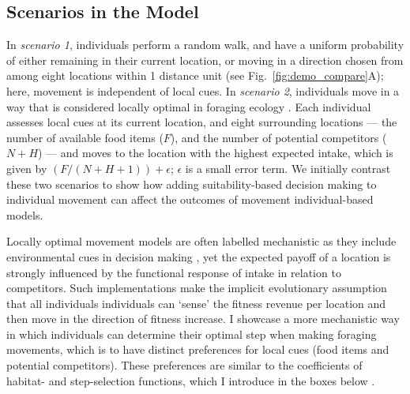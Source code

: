 \begin{interludeenv}
\subsection*{Scenarios in the Model}

In \textit{scenario 1}, individuals perform a random walk, and have a uniform probability of either remaining in their current location, or moving in a direction chosen from among eight locations within 1 distance unit (see Fig.~\ref{fig:demo_compare}A); here, movement is independent of local cues.
In \textit{scenario 2}, individuals move in a way that is considered locally optimal in foraging ecology \citep{stephens2019,scherer2020}.
Each individual assesses local cues at its current location, and eight surrounding locations --- the number of available food items ($F$), and the number of potential competitors ($N + H$) --- and moves to the location with the highest expected intake, which is given by $(F / (N + H + 1)) + \epsilon$; $\epsilon$ is a small error term.
We initially contrast these two scenarios to show how adding suitability-based decision making to individual movement can affect the outcomes of movement individual-based models.

Locally optimal movement models are often labelled mechanistic as they include environmental cues in decision making \citep[e.g.][]{scherer2020}, yet the expected payoff of a location is strongly influenced by the functional response of intake in relation to competitors.
Such implementations make the implicit evolutionary assumption that all individuals individuals can `sense' the fitness revenue per location and then move in the direction of fitness increase.
I showcase a more mechanistic way in which individuals can determine their optimal step when making foraging movements, which is to have distinct preferences for local cues (food items and potential competitors).
These preferences are similar to the coefficients of habitat- and step-selection functions, which I introduce in the boxes below \citep[][]{fortin2005,avgar2013,thurfjell2014,avgar2016,fieberg2010,manly2007}.


\end{interludeenv}
